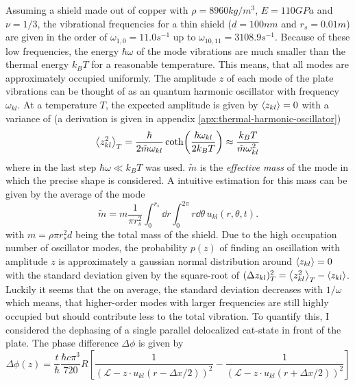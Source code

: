 Assuming a shield made out of copper with $\rho = 8960\si{kg/m^3}$, $E = 110\si{GPa}$ and $\nu = 1/3$, the vibrational frequencies for a thin shield ($d = 100\si{nm}$ and $r_s = 0.01\si{m}$) are given in the order of $\omega_{1,0}=11.0\si{s^{-1}}$ up to $\omega_{10,11} = 3108.9\si{s^{-1}}$.
Because of these low frequencies, the energy $\hbar \omega$ of the mode vibrations are much smaller than the thermal energy $k_B T$ for a reasonable temperature. This means, that all modes are approximately occupied uniformly.
The amplitude $z$ of each mode of the plate vibrations can be thought of as an quantum harmonic oscillator with frequency $\omega_{kl}$. At a temperature $T$, the expected amplitude is given by $\left\langle z_{kl}\right\rangle = 0$ with a variance of (a derivation is given in appendix \ref{apx:thermal-harmonic-oscillator})
\begin{equation}\label{eq:4:amplitude-variance}
  \left\langle z_{kl}^2\right\rangle_T = \frac{\hbar}{2\tilde{m}\omega_{kl}}\coth(\frac{\hbar \omega_{kl}}{2k_BT}) \approx \frac{k_B T}{\tilde{m}\omega_{kl}^2}
\end{equation}
where in the last step $\hbar\omega \ll k_B T$ was used. $\tilde{m}$ is the \textit{effective mass} of the mode in which the precise shape is considered. A intuitive estimation for this mass can be given by the average of the mode 
\begin{equation}\label{eq:4:effective-mass}
  \tilde{m} = m\frac{1}{\pi r_s^2}\int_0^{r_s} \dd r \int_0^{2\pi} r\dd\theta \, u_{kl}(r, \theta, t) .
\end{equation}
with $m=\rho \pi r_s^2 d$ being the total mass of the shield.
Due to the high occupation number of oscillator modes, the probability $p(z)$ of finding an oscillation with amplitude $z$ is approximately a gaussian normal distribution around $\left\langle z_{kl}\right\rangle = 0$ with the standard deviation given by the square-root of $(\Delta z_{kl})_T^2 = \left\langle z_{kl}^2\right\rangle_T - \left\langle z_{kl}\right\rangle$.
Luckily it seems that the on average, the standard deviation decreases with $1/\omega$ which means, that higher-order modes with larger frequencies are still highly occupied but should contribute less to the total vibration.
To quantify this, I considered the dephasing of a single parallel delocalized cat-state in front of the plate. The phase difference $\Delta \phi$ is given by
\begin{equation}\label{eq:4:phase-difference}
  \Delta\phi(z) = \frac{t}{\hbar} \frac{\hbar c \pi^3}{720} R \left[\frac{1}{(\mathscr{L}-z \cdot u_{kl}(r- \Delta x/2))^2} - \frac{1}{(\mathscr{L}-z \cdot u_{kl}(r + \Delta x/2))^2} \right]
\end{equation}
